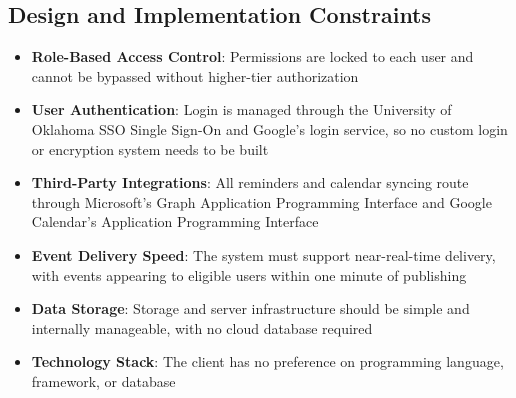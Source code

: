 \subsection{Design and Implementation Constraints}

\begin{itemize}
    \item \textbf{Role-Based Access Control}: Permissions are locked to each
    user and cannot be bypassed without higher-tier authorization

    \item \textbf{User Authentication}: Login is managed through the University
    of Oklahoma SSO Single Sign-On and Google's login service, so no custom
    login or encryption system needs to be built

    \item \textbf{Third-Party Integrations}: All reminders and calendar syncing
    route through Microsoft's Graph Application Programming Interface and Google
    Calendar's Application Programming Interface

    \item \textbf{Event Delivery Speed}: The system must support near-real-time
    delivery, with events appearing to eligible users within one minute of
    publishing

    \item \textbf{Data Storage}: Storage and server infrastructure should be
    simple and internally manageable, with no cloud database required

    \item \textbf{Technology Stack}: The client has no preference on programming
    language, framework, or database
\end{itemize}
